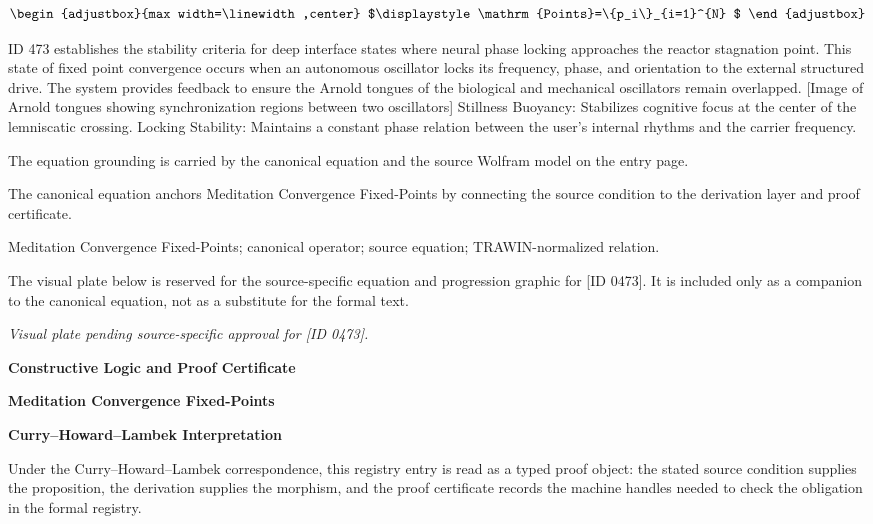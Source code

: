 \[
\begin{adjustbox}{max width=\linewidth,center}
$\displaystyle
\mathrm{Points}=\{p_i\}_{i=1}^{N}
$
\end{adjustbox}
\]

ID 473 establishes the stability criteria for deep interface states where neural phase locking approaches the reactor stagnation point. This state of fixed point convergence occurs when an autonomous oscillator locks its frequency, phase, and orientation to the external structured drive. The system provides feedback to ensure the Arnold tongues of the biological and mechanical oscillators remain overlapped. [Image of Arnold tongues showing synchronization regions between two oscillators] Stillness Buoyancy: Stabilizes cognitive focus at the center of the lemniscatic crossing. Locking Stability: Maintains a constant phase relation between the user's internal rhythms and the carrier frequency.

The equation grounding is carried by the canonical equation and the source Wolfram model on the entry page.

The canonical equation anchors Meditation Convergence Fixed-Points by connecting the source condition to the derivation layer and proof certificate.

Meditation Convergence Fixed-Points; canonical operator; source equation; TRAWIN-normalized relation.
\endgroup

\begingroup\footnotesize\sloppy
The visual plate below is reserved for the source-specific equation and progression graphic for [ID 0473]. It is included only as a companion to the canonical equation, not as a substitute for the formal text.
\par\endgroup
\begingroup\footnotesize\itshape
Visual plate pending source-specific approval for [ID 0473].
\par\endgroup

\clearpage
\begingroup\tzpsupportsetup
\noindent\textbf{\fontsize{10.8pt}{12.8pt}\selectfont [ID 0473] Constructive Logic and Proof Certificate}\par
\noindent\textbf{\fontsize{10pt}{12pt}\selectfont Meditation Convergence Fixed-Points}\par
\vspace{0.45em}
\begingroup
\footnotesize
\setlength{\parskip}{0.22em}
\setlength{\parindent}{0pt}
\noindent\textbf{Curry--Howard--Lambek Interpretation}\par
Under the Curry--Howard--Lambek correspondence, this registry entry is read as a typed proof
object: the stated source condition supplies the proposition, the derivation supplies the
morphism, and the proof certificate records the machine handles needed to check the obligation
in the formal registry.

